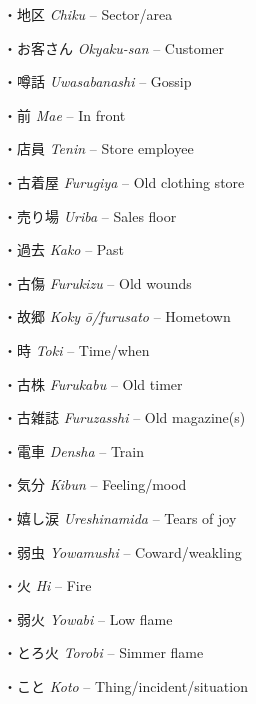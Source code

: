 \par{・地区 \emph{Chiku }– Sector\slash area }
 
\par{・お客さん \emph{Okyaku-san }– Customer }
 
\par{・噂話 \emph{Uwasabanashi }– Gossip }
 
\par{・前 \emph{Mae }– In front }
 
\par{・店員 \emph{Ten\textquotesingle in }– Store employee }
 
\par{・古着屋 \emph{Furugiya }– Old clothing store }
 
\par{・売り場 \emph{Uriba }– Sales floor }
 
\par{・過去 \emph{Kako }– Past }
 
\par{・古傷 \emph{Furukizu }– Old wounds }
 
\par{・故郷 \emph{Koky }\emph{ō\slash furusato }– Hometown }
 
\par{・時 \emph{Toki }– Time\slash when }
 
\par{・古株 \emph{Furukabu }– Old timer }
 
\par{・古雑誌 \emph{Furuzasshi }– Old magazine(s) }
 
\par{・電車 \emph{Densha }– Train }
 
\par{・気分 \emph{Kibun }– Feeling\slash mood }
 
\par{・嬉し涙 \emph{Ureshinamida }– Tears of joy }
 
\par{・弱虫 \emph{Yowamushi }– Coward\slash weakling }
 
\par{・火 \emph{Hi }– Fire }
 
\par{・弱火 \emph{Yowabi }– Low flame }
 
\par{・とろ火 \emph{Torobi }– Simmer flame }
 
\par{・こと \emph{Koto }– Thing\slash incident\slash situation }
 
